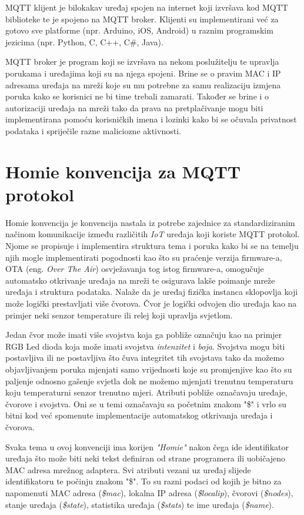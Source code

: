 \documentclass[times, utf8, zavrsni]{fer}
\begin{document}
MQTT klijent je bilokakav uređaj spojen na internet koji izvršava kod MQTT biblioteke te je spojeno na MQTT broker.
Klijenti su implementirani već za gotovo sve platforme (npr. Arduino, iOS, Android) u raznim programskim jezicima (npr. Python, C, C++, C\#, Java).

MQTT broker je program koji se izvršava na nekom poslužitelju te upravlja porukama i uređajima koji su na njega spojeni.
Brine se o pravim MAC i IP adresama uređaja na mreži koje su mu potrebne za samu realizaciju izmjena poruka kako se korisnici ne bi time trebali zamarati.
Također se brine i o autorizaciji uređaja na mreži tako da prava na pretplačivanje mogu biti implementirana pomoću korisničkih imena i lozinki kako bi se očuvala privatnost podataka i spriječile razne maliciozne aktivnosti.


\section{Homie konvencija za MQTT protokol}
Homie konvencija je konvencija nastala iz potrebe zajednice za standardiziranim načinom komunikacije između različitih \textit{IoT} uređaja koji koriste MQTT protokol.
Njome se propisuje i implementira struktura tema i poruka kako bi se na temelju njih mogle implementirati pogodnosti kao što su praćenje verzija firmware-a, OTA (eng. \textit{Over The Air}) osvježavanja tog istog firmware-a, omogučuje automatsko otkrivanje uređaja na mreži te osigurava lakše poimanje mreže uređaja i struktura podataka.
Nalaže da je uređaj fizička instanca sklopovlja koji može logički prestavljati više čvorova.
Čvor je logički odvojen dio uređaja kao na primjer neki senzor temperature ili relej koji upravlja svjetlom.

Jedan čvor može imati više svojstva koja ga pobliže označuju kao na primjer RGB Led dioda koja može imati svojstva \textit{intenzitet} i \textit{boja}.
Svojstva mogu biti postavljiva ili ne postavljiva što čuva integritet tih svojstava tako da možemo objavljivanjem poruka mjenjati samo vrijednosti koje su promjenjive kao što su paljenje odnosno gašenje svjetla dok ne možemo mjenjati trenutnu temperaturu koju temperaturni senzor trenutno mjeri.
Atributi pobliže označavaju uređaje, čvorove i svojstva.
Oni se u temi označavaju sa početnim znakom "\$" i vrlo su bitni kod već spomenute implementacije automatskog otkrivanja uređaja i čvorova.

Svaka tema u ovoj konvenciji ima korijen \textit{"Homie"} nakon čega ide identifikator uređaja što može biti neki tekst definiran od strane programera ili uobičajeno MAC adresa mrežnog adaptera.
Svi atributi vezani uz uređaj slijede identifikatoru te počinju znakom "\$".
To su razni podaci od kojih je bitno za napomenuti MAC adresa (\textit{\$mac}), lokalna IP adresa (\textit{\$localip}), čvorovi (\textit{\$nodes}), stanje uređaja (\textit{\$state}), statistika uređaja (\textit{\$stats}) te ime uređaja (\textit{\$name}).
\end{document}
